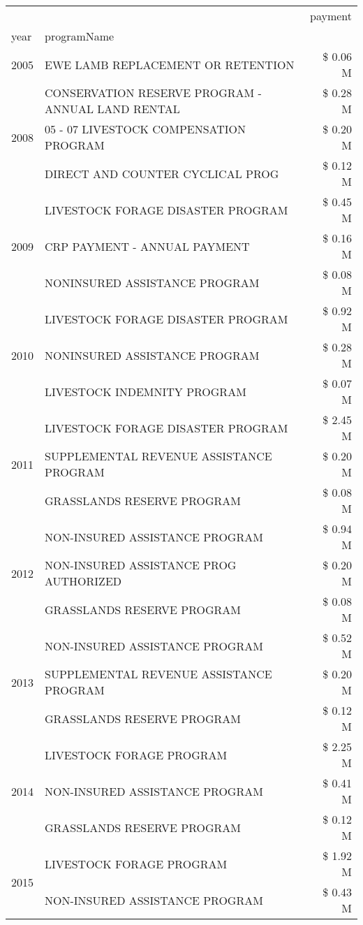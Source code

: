 \begin{tabular}{llr}
\toprule
 &  & payment \\
year & programName &  \\
\midrule
2005 & EWE LAMB REPLACEMENT OR RETENTION & \$ 0.06 M \\
\cline{1-3}
\multirow[t]{3}{*}{2008} & CONSERVATION RESERVE PROGRAM - ANNUAL LAND RENTAL & \$ 0.28 M \\
 & 05 - 07 LIVESTOCK COMPENSATION PROGRAM & \$ 0.20 M \\
 & DIRECT AND COUNTER CYCLICAL PROG & \$ 0.12 M \\
\cline{1-3}
\multirow[t]{3}{*}{2009} & LIVESTOCK FORAGE DISASTER  PROGRAM & \$ 0.45 M \\
 & CRP PAYMENT - ANNUAL PAYMENT & \$ 0.16 M \\
 & NONINSURED ASSISTANCE PROGRAM & \$ 0.08 M \\
\cline{1-3}
\multirow[t]{3}{*}{2010} & LIVESTOCK FORAGE DISASTER PROGRAM & \$ 0.92 M \\
 & NONINSURED ASSISTANCE PROGRAM & \$ 0.28 M \\
 & LIVESTOCK INDEMNITY PROGRAM & \$ 0.07 M \\
\cline{1-3}
\multirow[t]{3}{*}{2011} & LIVESTOCK FORAGE DISASTER PROGRAM & \$ 2.45 M \\
 & SUPPLEMENTAL REVENUE ASSISTANCE PROGRAM & \$ 0.20 M \\
 & GRASSLANDS RESERVE PROGRAM & \$ 0.08 M \\
\cline{1-3}
\multirow[t]{3}{*}{2012} & NON-INSURED ASSISTANCE PROGRAM & \$ 0.94 M \\
 & NON-INSURED ASSISTANCE PROG AUTHORIZED & \$ 0.20 M \\
 & GRASSLANDS RESERVE PROGRAM & \$ 0.08 M \\
\cline{1-3}
\multirow[t]{3}{*}{2013} & NON-INSURED ASSISTANCE PROGRAM & \$ 0.52 M \\
 & SUPPLEMENTAL REVENUE ASSISTANCE PROGRAM & \$ 0.20 M \\
 & GRASSLANDS RESERVE PROGRAM & \$ 0.12 M \\
\cline{1-3}
\multirow[t]{3}{*}{2014} & LIVESTOCK FORAGE PROGRAM & \$ 2.25 M \\
 & NON-INSURED ASSISTANCE PROGRAM & \$ 0.41 M \\
 & GRASSLANDS RESERVE PROGRAM & \$ 0.12 M \\
\cline{1-3}
\multirow[t]{3}{*}{2015} & LIVESTOCK FORAGE PROGRAM & \$ 1.92 M \\
 & NON-INSURED ASSISTANCE PROGRAM & \$ 0.43 M \\

\end{tabular}
